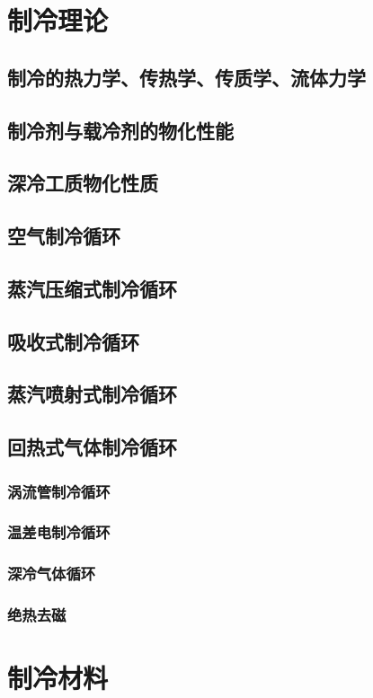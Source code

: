 \documentclass[UTF8]{../../ApplicationUniverse}
\begin{document}
\section{制冷理论}
    \subsection{制冷的热力学、传热学、传质学、流体力学}
    \subsection{制冷剂与载冷剂的物化性能}
    \subsection{深冷工质物化性质}
    \subsection{空气制冷循环}
    \subsection{蒸汽压缩式制冷循环}
    \subsection{吸收式制冷循环}
    \subsection{蒸汽喷射式制冷循环}
    \subsection{回热式气体制冷循环}
        \subsubsection{涡流管制冷循环}
        \subsubsection{温差电制冷循环}
        \subsubsection{深冷气体循环}
        \subsubsection{绝热去磁}
\section{制冷材料}
\end{document}
